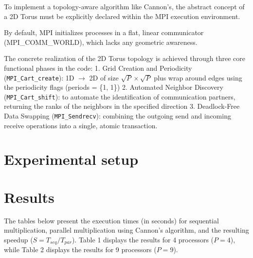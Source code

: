 \documentclass[
  12pt,
]{article}
\begin{document}
To implement a topology-aware algorithm like Cannon's, the abstract
concept of a 2D Torus must be explicitly declared within the MPI
execution environment.

By default, MPI initializes processes in a flat, linear communicator
(MPI\_COMM\_WORLD), which lacks any geometric awareness.

The concrete realization of the 2D Torus topology is achieved through
three core functional phases in the code: 1. Grid Creation and
Periodicity (\texttt{MPI\_Cart\_create}): 1D \(\rightarrow\) 2D of size
\(\sqrt{P} \times \sqrt{P}\) plus wrap around edges using the
periodicity flags (periods = \{1, 1\}) 2. Automated Neighbor Discovery
(\texttt{MPI\_Cart\_shift}): to automate the identification of
communication partners, returning the ranks of the neighbors in the
specified direction 3. Deadlock-Free Data Swapping
(\texttt{MPI\_Sendrecv}): combining the outgoing send and incoming
receive operations into a single, atomic transaction.

\section{Experimental setup}\label{experimental-setup}

\section{Results}\label{results}

The tables below present the execution times (in seconds) for sequential
multiplication, parallel multiplication using Cannon's algorithm, and
the resulting speedup (\(S = T_{seq} / T_{par}\)). Table 1 displays the
results for 4 processors (\(P = 4\)), while Table 2 displays the results
for 9 processors (\(P = 9\)).
\end{document}
